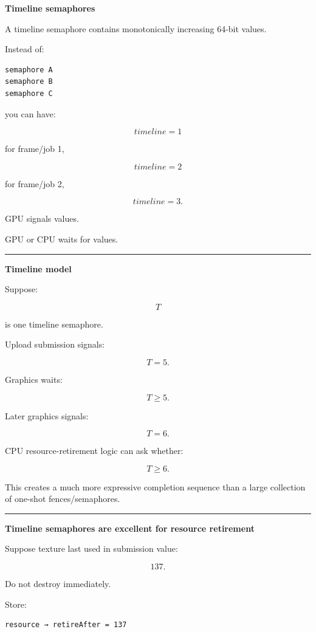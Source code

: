 \textbf{Timeline semaphores}

A timeline semaphore contains monotonically increasing 64-bit values.

Instead of:

\begin{verbatim}
semaphore A
semaphore B
semaphore C
\end{verbatim}

you can have:

\[
timeline=1
\]

for frame/job 1,

\[
timeline=2
\]

for frame/job 2,

\[
timeline=3.
\]

GPU signals values.

GPU or CPU waits for values.

\begin{center}\rule{0.5\linewidth}{0.5pt}\end{center}

\textbf{Timeline model}

Suppose:

\[
T
\]

is one timeline semaphore.

Upload submission signals:

\[
T=5.
\]

Graphics waits:

\[
T\ge5.
\]

Later graphics signals:

\[
T=6.
\]

CPU resource-retirement logic can ask whether:

\[
T\ge6.
\]

This creates a much more expressive completion sequence than a large collection of one-shot fences/semaphores.

\begin{center}\rule{0.5\linewidth}{0.5pt}\end{center}

\textbf{Timeline semaphores are excellent for resource retirement}

Suppose texture last used in submission value:

\[
137.
\]

Do not destroy immediately.

Store:

\begin{verbatim}
resource → retireAfter = 137
\end{verbatim}

